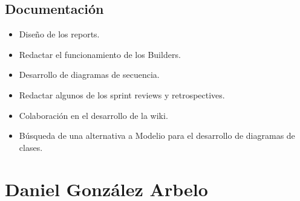 \documentclass{article}
\begin{document}
\subsection*{Documentación}
\begin{itemize}
\item Diseño de los reports.
\item Redactar el funcionamiento de los Builders.
\item Desarrollo de diagramas de secuencia.
\item Redactar algunos de los sprint reviews y retrospectives.
\item Colaboración en el desarrollo de la wiki.
\item Búsqueda de una alternativa a Modelio para el desarrollo de diagramas de clases.
\end{itemize}

\section*{Daniel González Arbelo}
\end{document}
